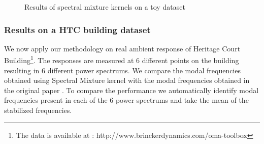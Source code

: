 \begin{figure}[!ht]
  \centering
  \quad
    \quad
  
  \caption{Results of spectral mixture kernels on a toy dataset}
\end{figure}

\subsubsection{Results on a HTC building dataset}
We now apply our methodology on real ambient response of Heritage Court Building\footnote{The data is available at : http://www.brinckerdynamics.com/oma-toolbox}. The responses are measured at 6 different points on the building resulting in 6 different power spectrums. We compare the modal frequencies obtained using Spectral Mixture kernel with the modal frequencies obtained in the original paper \cite{brincker2000modal}. To compare the performance we automatically identify modal frequencies present in each of the 6 power spectrums and take the mean of the stabilized frequencies.

